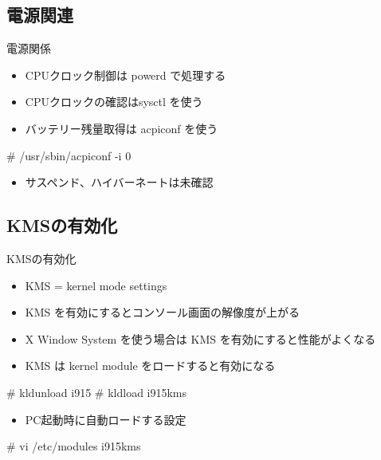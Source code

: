 \subsection{電源関連}
\begin{frame}[containsverbatim]{電源関係}
  \begin{itemize}
  \item CPUクロック制御は powerd で処理する
  \item CPUクロックの確認はsysctl を使う
  \end{itemize}


  \begin{itemize}
  \item バッテリー残量取得は acpiconf を使う
  \end{itemize}

\begin{commandlinesmall}
# /usr/sbin/acpiconf -i 0
\end{commandlinesmall}

  \begin{itemize}
  \item サスペンド、ハイバーネートは未確認
  \end{itemize}
\end{frame}


\subsection{KMSの有効化}
\begin{frame}[containsverbatim]{KMSの有効化}
  \begin{itemize}
  \item KMS = kernel mode settings
  \item KMS を有効にするとコンソール画面の解像度が上がる
  \item X Window System を使う場合は KMS を有効にすると性能がよくなる
  \item KMS は kernel module をロードすると有効になる
  \end{itemize}

\begin{commandlinesmall}
# kldunload i915
# kldload i915kms
\end{commandlinesmall}

  \begin{itemize}
  \item PC起動時に自動ロードする設定
  \end{itemize}

\begin{commandlinesmall}
# vi /etc/modules
i915kms
\end{commandlinesmall}

\end{frame}


